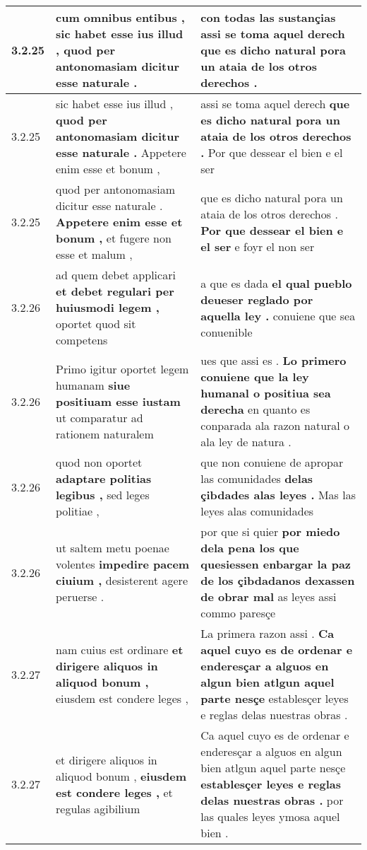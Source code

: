 \begin{tabular}{|p{1cm}|p{6.5cm}|p{6.5cm}|}
3.2.25 & cum omnibus entibus , \textbf{ sic habet esse ius illud , } quod per antonomasiam dicitur esse naturale . & con todas las sustançias \textbf{ assi se toma aquel derech } que es dicho natural pora un ataia de los otros derechos . \\\hline
3.2.25 & sic habet esse ius illud , \textbf{ quod per antonomasiam dicitur esse naturale . } Appetere enim esse et bonum , & assi se toma aquel derech \textbf{ que es dicho natural pora un ataia de los otros derechos . } Por que dessear el bien e el ser \\\hline
3.2.25 & quod per antonomasiam dicitur esse naturale . \textbf{ Appetere enim esse et bonum , } et fugere non esse et malum , & que es dicho natural pora un ataia de los otros derechos . \textbf{ Por que dessear el bien e el ser } e foyr el non ser \\\hline
3.2.26 & ad quem debet applicari \textbf{ et debet regulari per huiusmodi legem , } oportet quod sit competens & a que es dada \textbf{ el qual pueblo deueser reglado por aquella ley . } conuiene que sea conuenible \\\hline
3.2.26 & Primo igitur oportet legem humanam \textbf{ siue positiuam esse iustam } ut comparatur ad rationem naturalem & ues que assi es . \textbf{ Lo primero conuiene que la ley humanal o positiua sea derecha } en quanto es conparada ala razon natural o ala ley de natura . \\\hline
3.2.26 & quod non oportet \textbf{ adaptare politias legibus , } sed leges politiae , & que non conuiene de apropar las comunidades \textbf{ delas çibdades alas leyes . } Mas las leyes alas comunidades \\\hline
3.2.26 & ut saltem metu poenae volentes \textbf{ impedire pacem ciuium , } desisterent agere peruerse . & por que si quier \textbf{ por miedo dela pena los que quesiessen enbargar la paz de los çibdadanos dexassen de obrar mal } as leyes assi commo paresçe \\\hline
3.2.27 & nam cuius est ordinare \textbf{ et dirigere aliquos in aliquod bonum , } eiusdem est condere leges , & La primera razon assi . \textbf{ Ca aquel cuyo es de ordenar e enderesçar a alguos en algun bien atlgun aquel parte nesçe } establesçer leyes e reglas delas nuestras obras . \\\hline
3.2.27 & et dirigere aliquos in aliquod bonum , \textbf{ eiusdem est condere leges , } et regulas agibilium & Ca aquel cuyo es de ordenar e enderesçar a alguos en algun bien atlgun aquel parte nesçe \textbf{ establesçer leyes e reglas delas nuestras obras . } por las quales leyes ymosa aquel bien . \\\hline

\end{tabular}
